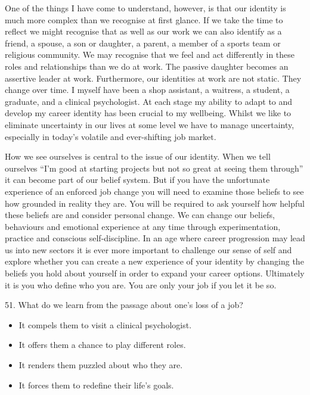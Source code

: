 \documentclass[UTF8,11pt]{ctexart}
\begin{document}
One of the things I have come to understand, however, is that our identity is much more complex than we recognise at first glance. If we take the time to reflect we might recognise that as well as our work we can also identify as a friend, a spouse, a son or daughter, a parent, a member of a sports team or religious community. We may recognise that we feel and act differently in these roles and relationships than we do at work. The passive daughter becomes an assertive leader at work. Furthermore, our identities at work are not static. They change over time. I myself have been a shop assistant, a waitress, a student, a graduate, and a clinical psychologist. At each stage my ability to adapt to and develop my career identity has been crucial to my wellbeing. Whilst we like to eliminate uncertainty in our lives at some level we have to manage uncertainty, especially in today’s volatile and ever-shifting job market.


How we see ourselves is central to the issue of our identity. When we tell ourselves “I’m good at starting projects but not so great at seeing them through” it can become part of our belief system. But if you have the unfortunate experience of an enforced job change you will need to examine those beliefs to see how grounded in reality they are. You will be required to ask yourself how helpful these beliefs are and consider personal change. We can change our beliefs, behaviours and emotional experience at any time through experimentation, practice and conscious self-discipline. In an age where career progression may lead us into new sectors it is ever more important to challenge our sense of self and explore whether you can create a new experience of your identity by changing the beliefs you hold about yourself in order to expand your career options. Ultimately it is you who define who you are. You are only your job if you let it be so.


51. What do we learn from the passage about one’s loss of a job?


\begin{itemize}[leftmargin=2em,itemsep=.2em,topsep=.4em]\item[A.] It compels them to visit a clinical psychologist.
\item[B.] It offers them a chance to play different roles.
\item[C.] It renders them puzzled about who they are.
\item[D.] It forces them to redefine their life’s goals.
\end{itemize}
\end{document}
